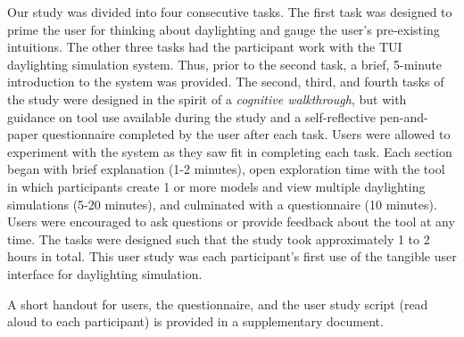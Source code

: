 \documentclass{article}
\begin{document}
Our study was divided into four consecutive tasks.  The first task was
designed to prime the user for thinking about daylighting and gauge
the user's pre-existing intuitions.  The other three tasks had the
participant work with the TUI daylighting simulation system.  Thus,
prior to the second task, a brief, 5-minute introduction to the system
was provided.  The second, third, and fourth tasks of the study were
designed in the spirit of a \emph{cognitive walkthrough}, but with
guidance on tool use available during the study and a self-reflective
pen-and-paper questionnaire completed by the user after each task.
Users were allowed to experiment with the system as they saw fit in
completing each task.
%
Each section began with brief explanation (1-2 minutes), open
exploration time with the tool in which participants create 1 or more
models and view multiple daylighting simulations (5-20 minutes), and
culminated with a questionnaire (10 minutes).  Users were encouraged
to ask questions or provide feedback about the tool at any time.  The
tasks were designed such that the study took approximately 1 to 2
hours in total.  This user study was each participant's first use
of the tangible user interface for daylighting simulation.

A short handout for users, the questionnaire, and the user study
script (read aloud to each participant) is provided in a supplementary
document.






%
\end{document}
